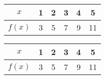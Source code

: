 \documentclass[11pt]{article}
\begin{document}
\begin{tabular}{c|ccccc}
$x$ & 1 & 2 & 3 & 4 & 5\\ \hline
$f(x)$ & 3 & 5 & 7 & 9 & 11
\end{tabular}

\begin{tabular}{|c|ccccc|}
\hline
$x$ & 1 & 2 & 3 & 4 & 5\\ \hline
$f(x)$ & 3 & 5 & 7 & 9 & 11\\ \hline
\end{tabular}
\end{document}
